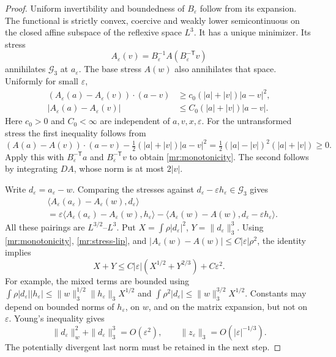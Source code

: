 \begin{proof}
Uniform invertibility and boundedness of $B_\varepsilon$ follow from its
expansion. The functional is strictly convex, coercive and weakly lower
semicontinuous on the closed affine subspace of the reflexive space $L^3$.
It has a unique minimizer. Its stress
\[
 A_\varepsilon(v)=B_\varepsilon^{-1}
                   A(B_\varepsilon^{-\mathsf T}v)
\]
annihilates $\mathcal G_3$ at $a_\varepsilon$. The base stress $A(w)$
also annihilates that space. Uniformly for small $\varepsilon$,
\begin{align}
 (A_\varepsilon(a)-A_\varepsilon(v))\cdot(a-v)
   &\ge c_0(|a|+|v|)|a-v|^2,\label{mr:monotonicity}\\
 |A_\varepsilon(a)-A_\varepsilon(v)|
   &\le C_0(|a|+|v|)|a-v|.\label{mr:stress-lip}
\end{align}
Here $c_0>0$ and $C_0<\infty$ are independent of $a,v,x,\varepsilon$.
For the untransformed stress the first inequality follows from
\[
 (A(a)-A(v))\cdot(a-v)
 -\tfrac12(|a|+|v|)|a-v|^2
   =\tfrac12(|a|-|v|)^2(|a|+|v|)\ge0.
\]
Apply this with $B_\varepsilon^{-\mathsf T}a$ and
$B_\varepsilon^{-\mathsf T}v$ to obtain \eqref{mr:monotonicity}.
The second follows by integrating $DA$, whose norm is at most $2|v|$.

Write $d_\varepsilon=a_\varepsilon-w$. Comparing the stresses against
$d_\varepsilon-\varepsilon h_\varepsilon\in\mathcal G_3$ gives
\begin{align*}
 &\langle A_\varepsilon(a_\varepsilon)-A_\varepsilon(w),d_\varepsilon\rangle\\
 &=\varepsilon\langle A_\varepsilon(a_\varepsilon)
            -A_\varepsilon(w),h_\varepsilon\rangle
   -\langle A_\varepsilon(w)-A(w),
                         d_\varepsilon-\varepsilon h_\varepsilon\rangle.
\end{align*}
All these pairings are $L^{3/2}$--$L^3$. Put
$X=\int\rho|d_\varepsilon|^2$, $Y=\|d_\varepsilon\|_3^3$.
Using \eqref{mr:monotonicity}, \eqref{mr:stress-lip}, and
$|A_\varepsilon(w)-A(w)|\le C|\varepsilon|\rho^2$, the identity implies
\[
 X+Y\le C|\varepsilon|(X^{1/2}+Y^{2/3})+C\varepsilon^2.
\]
For example, the mixed terms are bounded using
$\int\rho|d_\varepsilon||h_\varepsilon|
\le\|w\|_3^{1/2}\|h_\varepsilon\|_3X^{1/2}$ and
$\int\rho^2|d_\varepsilon|\le\|w\|_3^{3/2}X^{1/2}$.
Constants may depend on bounded norms of $h_\varepsilon$, on $w$, and on
the matrix expansion, but not on $\varepsilon$. Young's inequality gives
\begin{equation}\label{mr:rough}
 \|d_\varepsilon\|_w^2+\|d_\varepsilon\|_3^3=O(\varepsilon^2),
 \qquad \|z_\varepsilon\|_3=O(|\varepsilon|^{-1/3}).
\end{equation}
The potentially divergent last norm must be retained in the next step.


\end{proof}
